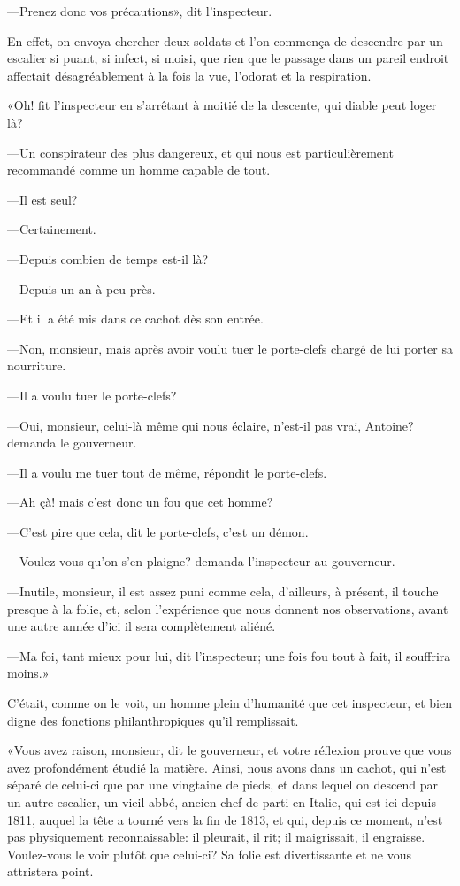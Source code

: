 —Prenez donc vos précautions», dit l'inspecteur.

En effet, on envoya chercher deux soldats et l'on commença de descendre par un escalier si puant, si infect, si moisi, que rien que le passage dans un pareil endroit affectait désagréablement à la fois la vue, l'odorat et la respiration.

«Oh! fit l'inspecteur en s'arrêtant à moitié de la descente, qui diable peut loger là?

—Un conspirateur des plus dangereux, et qui nous est particulièrement recommandé comme un homme capable de tout.

—Il est seul?

—Certainement.

—Depuis combien de temps est-il là?

—Depuis un an à peu près.

—Et il a été mis dans ce cachot dès son entrée.

—Non, monsieur, mais après avoir voulu tuer le porte-clefs chargé de lui porter sa nourriture.

—Il a voulu tuer le porte-clefs?

—Oui, monsieur, celui-là même qui nous éclaire, n'est-il pas vrai, Antoine? demanda le gouverneur.

—Il a voulu me tuer tout de même, répondit le porte-clefs.

—Ah çà! mais c'est donc un fou que cet homme?

—C'est pire que cela, dit le porte-clefs, c'est un démon.

—Voulez-vous qu'on s'en plaigne? demanda l'inspecteur au gouverneur.

—Inutile, monsieur, il est assez puni comme cela, d'ailleurs, à présent, il touche presque à la folie, et, selon l'expérience que nous donnent nos observations, avant une autre année d'ici il sera complètement aliéné.

—Ma foi, tant mieux pour lui, dit l'inspecteur; une fois fou tout à fait, il souffrira moins.»

C'était, comme on le voit, un homme plein d'humanité que cet inspecteur, et bien digne des fonctions philanthropiques qu'il remplissait.

«Vous avez raison, monsieur, dit le gouverneur, et votre réflexion prouve que vous avez profondément étudié la matière. Ainsi, nous avons dans un cachot, qui n'est séparé de celui-ci que par une vingtaine de pieds, et dans lequel on descend par un autre escalier, un vieil abbé, ancien chef de parti en Italie, qui est ici depuis 1811, auquel la tête a tourné vers la fin de 1813, et qui, depuis ce moment, n'est pas physiquement reconnaissable: il pleurait, il rit; il maigrissait, il engraisse. Voulez-vous le voir plutôt que celui-ci? Sa folie est divertissante et ne vous attristera point.

